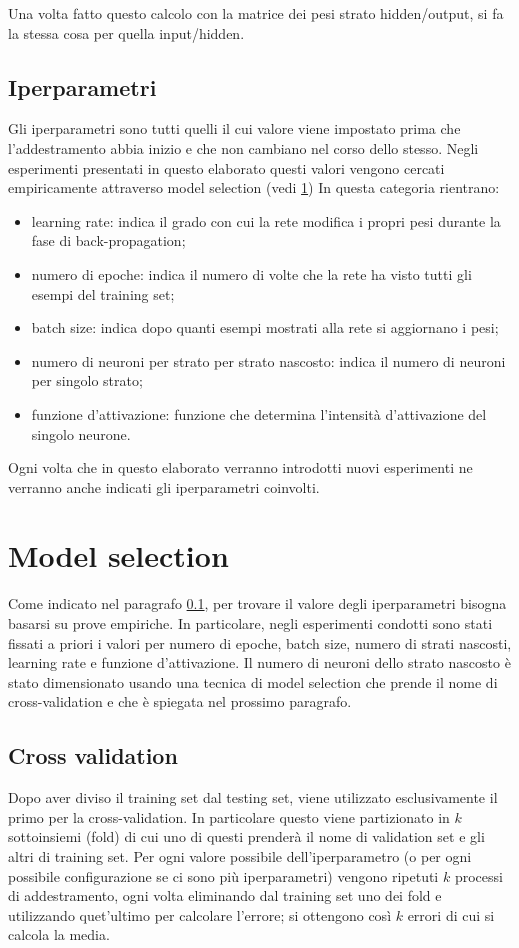 \documentclass[12pt]{report}
\begin{document}
Una volta fatto questo calcolo con la matrice dei pesi strato hidden/output, si fa la stessa cosa per quella input/hidden.

\subsection{Iperparametri}\label{iperparametri}
Gli iperparametri sono tutti quelli il cui valore viene impostato prima che l'addestramento abbia inizio e che non cambiano nel corso dello stesso. Negli esperimenti presentati in questo elaborato questi valori vengono cercati empiricamente attraverso model selection (vedi \ref{modelselection})
In questa categoria rientrano:
\begin{itemize}
\item{learning rate}: indica il grado con cui la rete modifica i propri pesi durante la fase di back-propagation;
\item{numero di epoche}: indica il numero di volte che la rete ha visto tutti gli esempi del training set;
\item{batch size}: indica dopo quanti esempi mostrati alla rete si aggiornano i pesi;
\item{numero di neuroni per strato per strato nascosto}: indica il numero di neuroni per singolo strato;
\item{funzione d'attivazione}: funzione che determina l'intensità d'attivazione del singolo neurone.
\end{itemize}

Ogni volta che in questo elaborato verranno introdotti nuovi esperimenti ne verranno anche indicati gli iperparametri coinvolti.

\section{Model selection}\label{modelselection}
Come indicato nel paragrafo \ref{iperparametri}, per trovare il valore degli iperparametri bisogna basarsi su prove empiriche. In particolare, negli esperimenti condotti sono stati fissati a priori i valori per numero di epoche, batch size, numero di strati nascosti, learning rate e funzione d'attivazione. Il numero di neuroni dello strato nascosto è stato dimensionato usando una tecnica di model selection che prende il nome di cross-validation e che è spiegata nel prossimo paragrafo.

\subsection{Cross validation}\label{crossvalidation}
Dopo aver diviso il training set dal testing set, viene utilizzato esclusivamente  il primo per la cross-validation. In particolare questo viene partizionato in $k$ sottoinsiemi (fold) di cui uno di questi prenderà il nome di validation set e gli altri di training set. Per ogni valore possibile dell'iperparametro (o per ogni possibile configurazione se ci sono più iperparametri) vengono ripetuti $k$ processi di addestramento, ogni volta eliminando dal training set uno dei fold e utilizzando quet'ultimo per calcolare l'errore; si ottengono così $k$ errori di cui si calcola la media.
\end{document}
